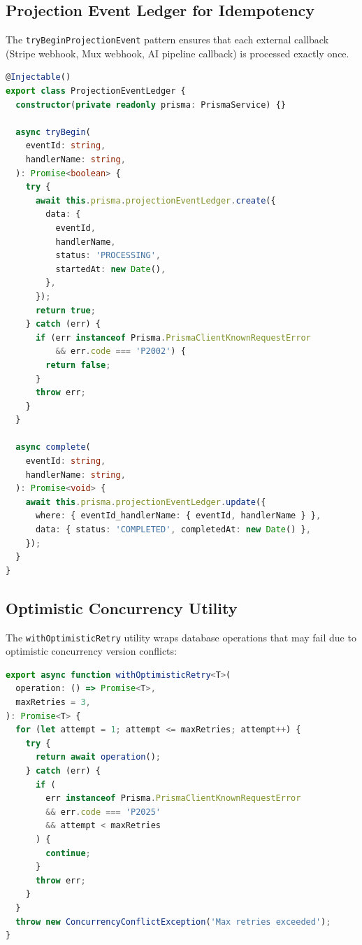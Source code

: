 \subsection{Projection Event Ledger for Idempotency}

The \texttt{tryBeginProjectionEvent} pattern ensures that each external callback (Stripe webhook, Mux webhook, AI pipeline callback) is processed exactly once.

\begin{lstlisting}[language=TypeScript,caption=Projection event ledger,label=lst:proj-event-ledger]
@Injectable()
export class ProjectionEventLedger {
  constructor(private readonly prisma: PrismaService) {}

  async tryBegin(
    eventId: string,
    handlerName: string,
  ): Promise<boolean> {
    try {
      await this.prisma.projectionEventLedger.create({
        data: {
          eventId,
          handlerName,
          status: 'PROCESSING',
          startedAt: new Date(),
        },
      });
      return true;
    } catch (err) {
      if (err instanceof Prisma.PrismaClientKnownRequestError
          && err.code === 'P2002') {
        return false;
      }
      throw err;
    }
  }

  async complete(
    eventId: string,
    handlerName: string,
  ): Promise<void> {
    await this.prisma.projectionEventLedger.update({
      where: { eventId_handlerName: { eventId, handlerName } },
      data: { status: 'COMPLETED', completedAt: new Date() },
    });
  }
}
\end{lstlisting}

\subsection{Optimistic Concurrency Utility}

The \texttt{withOptimisticRetry} utility wraps database operations that may fail due to optimistic concurrency version conflicts:

\begin{lstlisting}[language=TypeScript,caption=Optimistic concurrency retry,label=lst:optimistic-retry-util]
export async function withOptimisticRetry<T>(
  operation: () => Promise<T>,
  maxRetries = 3,
): Promise<T> {
  for (let attempt = 1; attempt <= maxRetries; attempt++) {
    try {
      return await operation();
    } catch (err) {
      if (
        err instanceof Prisma.PrismaClientKnownRequestError
        && err.code === 'P2025'
        && attempt < maxRetries
      ) {
        continue;
      }
      throw err;
    }
  }
  throw new ConcurrencyConflictException('Max retries exceeded');
}
\end{lstlisting}

